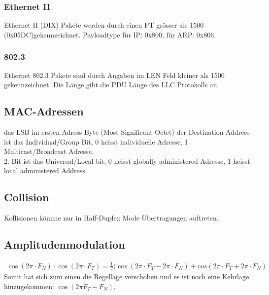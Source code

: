 \subsubsection{Ethernet II}
Ethernet II (DIX) Pakete werden durch einen PT grösser als 1500 (0x05DC)gekennzeichnet. Payloadtype für IP: 0x800, für ARP: 0x806.

\subsubsection{802.3}
Ethernet 802.3 Pakete sind durch Angaben im LEN Feld kleiner als 1500 gekennzeichnet. Die Länge gibt die PDU Länge des LLC Protokolls an.

\subsection{MAC-Adressen}
das LSB im ersten Adress Byte (Most Significant Octet) der Destination Address ist das Individual/Group Bit, 0 heisst individuelle Adresse, 1 Multicast/Broadcast Adresse.\\
2. Bit ist das Universal/Local bit, 0 heisst globally administered Adresse, 1 heisst local administered Address.

\subsection{Collision}
Kollisionen könnne nur in Half-Duplex Mode Übertragungen auftreten.


\subsection{Amplitudenmodulation}
\begin{align*}
\cos (2\pi \cdot F_N) \cdot \cos (2\pi \cdot F_T)
= \frac{1}{2}(\cos (2\pi \cdot F_T - 2\pi \cdot F_N) + cos(2\pi \cdot F_T + 2\pi \cdot F_N)
\end{align*}
Somit hat sich zum einen die Regellage verschoben und es ist noch eine Kehrlage hinzugekommen: $\cos (2\pi F_T - F_N)$.
